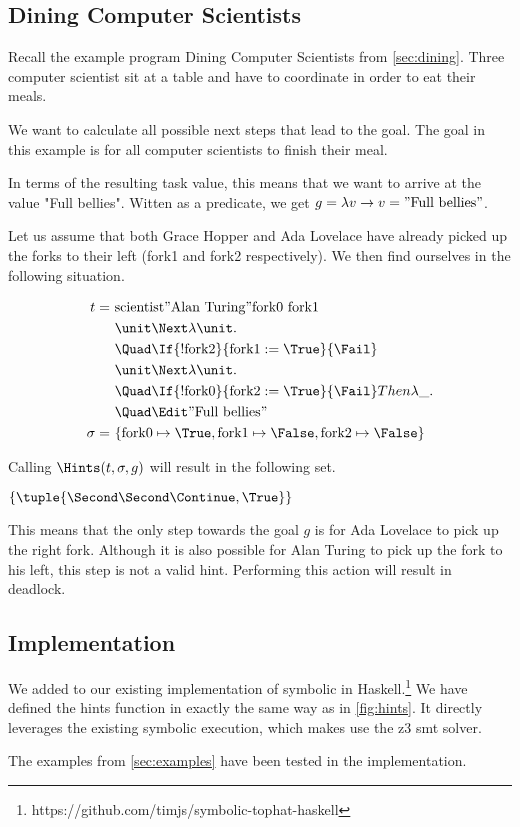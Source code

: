 \subsection{Dining Computer Scientists}
\label{sec:assistivedining}

Recall the example program Dining Computer Scientists from \cref{sec:dining}.
Three computer scientist sit at a table and have to coordinate in order to eat their meals.

We want to calculate all possible next steps that lead to the goal.
The goal in this example is for all computer scientists to finish their meal.

In terms of the resulting task value, this means that we want to arrive at the value "Full bellies".
Witten as a predicate, we get $g=\lambda v\rightarrow v = "\text{Full bellies}"$.

Let us assume that both Grace Hopper and Ada Lovelace have already picked up the forks to their left (fork1 and fork2 respectively).
We then find ourselves in the following situation.


\begin{align*}
t =\ &\text{scientist} "\text{Alan Turing}" \text{fork0}\ \text{fork1} \And\\
    &\unit \Next \lambda \unit .\\
    &\Quad \If{!\text{fork2}}{\text{fork1} := \True}{\Fail} \And\\
    &\unit \Next \lambda \unit .\\
    &\Quad \If{!\text{fork0}}{\text{fork2} := \True}{\Fail} Then \lambda \_.\\
    &\Quad \Edit "\text{Full bellies}"\\
\sigma =\ &\{\text{fork0}\mapsto \True, \text{fork1}\mapsto \False,\text{fork2}\mapsto \False\}
\end{align*}

Calling $\Hints(t,\sigma,g)$ will result in the following set.

$\{ \tuple{\Second\Second\Continue,\True}\}$

This means that the only step towards the goal $g$ is for Ada Lovelace to pick up the right fork.
Although it is also possible for Alan Turing to pick up the fork to his left, this step is not a valid hint.
Performing this action will result in deadlock.


\subsection{Implementation}
\label{sec:implementation}

We added \ASTOPHAT to our existing implementation of symbolic \TOPHAT in Haskell.\footnote{https://github.com/timjs/symbolic-tophat-haskell}
We have defined the hints function in exactly the same way as in \cref{fig:hints}.
It directly leverages the existing symbolic execution, which makes use the z3 smt solver.

The examples from \cref{sec:examples} have been tested in the implementation.
